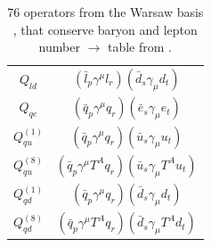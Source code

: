 \begin{table}[htbp]
{\begin{tabular}[t]{c|c}
        $Q_{ld}$ & $(\bar{l}_p \gamma^\mu l_r)(\bar{d}_s \gamma_\mu d_t)$ \\
        $Q_{qe}$ & $(\bar{q}_p \gamma^\mu q_r)(\bar{e}_s \gamma_\mu e_t)$ \\
        $Q_{qu}^{(1)}$ & $(\bar{q}_p \gamma^\mu q_r)(\bar{u}_s \gamma_\mu u_t)$ \\
        $Q_{qu}^{(8)}$ & $(\bar{q}_p \gamma^\mu T^A q_r)(\bar{u}_s \gamma_\mu T^A u_t)$ \\
        $Q_{qd}^{(1)}$ & $(\bar{q}_p \gamma^\mu q_r)(\bar{d}_s \gamma_\mu d_t)$ \\
        $Q_{qd}^{(8)}$ & $(\bar{q}_p \gamma^\mu T^A q_r)(\bar{d}_s \gamma_\mu T^A d_t)$
    \end{tabular}
    } %
    
    \vspace{1em}
    \caption{76 operators from the Warsaw basis \parencite{grzadkowski2010dimension}, that conserve baryon and lepton number $\to$ table from \parencite{jenkins2018lowOM}.}
    \label{tab:dim6SMEFTbasis}
\end{table}


